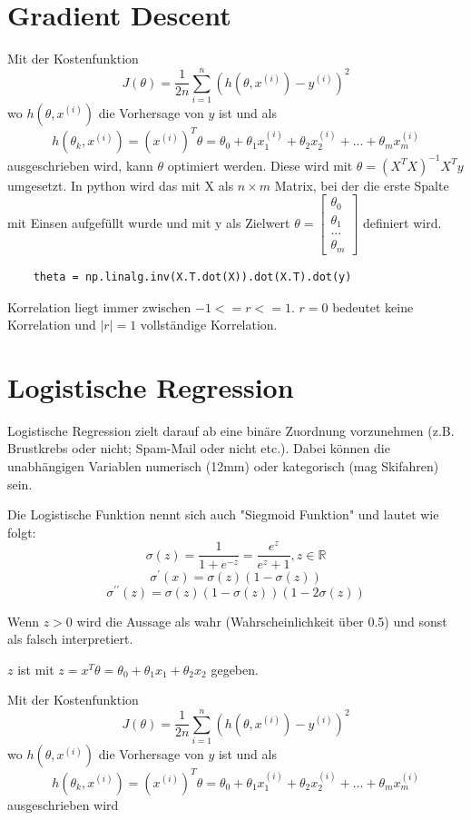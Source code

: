 \documentclass{article}
\begin{document}
\section{Gradient Descent}
	Mit der Kostenfunktion $$J(\theta) = \frac{1}{2 n} \sum_{i=1}^{n}(h(\theta,x^{(i)})-y^{(i)})^2$$ wo $h(\theta,x^{(i)})$ die Vorhersage von $y$ ist und als $$h(\theta_k,x^{(i)})= (x^{(i)})^T\theta=\theta_0+\theta_1x_1^{(i)}+\theta_2x_2^{(i)}+...+\theta_mx_m^{(i)}$$
	ausgeschrieben wird, kann $\theta$ optimiert werden.	
	Diese wird mit $\theta = (X^T X)^{-1} X^T y$ umgesetzt. 
	In python wird das mit X als $n \times m$ Matrix, bei der die erste Spalte mit Einsen aufgefüllt wurde und mit y als Zielwert
	$\theta = 
	\begin{bmatrix}
	\theta_0 \\[0.1pt] \theta_1 \\[0.1pt] ... \\[0.1pt] \theta_m
	\end{bmatrix}$ definiert wird.
	
	\begin{lstlisting}
	theta = np.linalg.inv(X.T.dot(X)).dot(X.T).dot(y)
	\end{lstlisting}
	
	Korrelation liegt immer zwischen $-1 <= r <= 1$.
	$r = 0$ bedeutet keine Korrelation und $|r| = 1$ vollständige Korrelation.
\section{Logistische Regression}
	Logistische Regression zielt darauf ab eine binäre Zuordnung vorzunehmen (z.B. Brustkrebs oder nicht; Spam-Mail oder nicht etc.).
	Dabei können die unabhängigen Variablen numerisch (12mm) oder kategorisch (mag Skifahren) sein.
	
	Die Logistische Funktion nennt sich auch "Siegmoid Funktion" und lautet wie folgt:
	$$\sigma(z) = \frac{1}{1+e^{-z}} = \frac{e^z}{e^z+1}, z \in \mathbb{R}$$
	$$\sigma^{\prime}(x) = \sigma(z) (1-\sigma(z))$$
	$$\sigma^{\prime\prime}(z)= \sigma(z)(1-\sigma(z))(1-2\sigma(z))$$
	
	Wenn $z > 0$ wird die Aussage als wahr (Wahrscheinlichkeit über 0.5) und sonst als falsch interpretiert.
	
	$z$ ist mit $z=x^T \theta = \theta_0 + \theta_1 x_1 + \theta_2 x_2$ gegeben.
	
	Mit der Kostenfunktion $$J(\theta) = \frac{1}{2 n} \sum_{i=1}^{n}(h(\theta,x^{(i)})-y^{(i)})^2$$ wo $h(\theta,x^{(i)})$ die Vorhersage von $y$ ist und als $$h(\theta_k,x^{(i)})= (x^{(i)})^T\theta=\theta_0+\theta_1x_1^{(i)}+\theta_2x_2^{(i)}+...+\theta_mx_m^{(i)}$$
	ausgeschrieben wird
\end{document}
